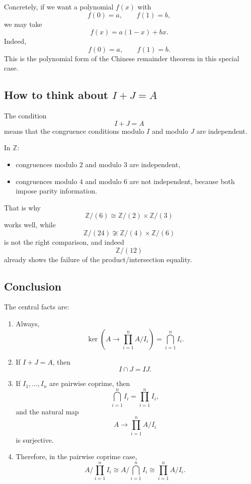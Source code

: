 \documentclass[12pt,a4paper]{article}
\theoremstyle{notespace}
\begin{document}
Concretely, if we want a polynomial \(f(x)\) with
\[
f(0)=a,\qquad f(1)=b,
\]
we may take
\[
f(x)=a(1-x)+bx.
\]
Indeed,
\[
f(0)=a,\qquad f(1)=b.
\]
This is the polynomial form of the Chinese remainder theorem in this special case.

\subsection{How to think about \(I+J=A\)}

The condition
\[
I+J=A
\]
means that the congruence conditions modulo \(I\) and modulo \(J\) are independent.

In \(\mathbb Z\):

\begin{itemize}
	\item congruences modulo \(2\) and modulo \(3\) are independent,
	\item congruences modulo \(4\) and modulo \(6\) are not independent, because both impose parity information.
\end{itemize}

That is why
\[
\mathbb Z/(6)\cong \mathbb Z/(2)\times \mathbb Z/(3)
\]
works well, while
\[
\mathbb Z/(24)\not\cong \mathbb Z/(4)\times \mathbb Z/(6)
\]
is not the right comparison, and indeed
\[
\mathbb Z/(12)
\]
already shows the failure of the product/intersection equality.

\subsection{Conclusion}

The central facts are:

\begin{enumerate}
	\item Always,
	\[
	\ker\!\left(A\to \prod_{i=1}^n A/I_i\right)=\bigcap_{i=1}^n I_i.
	\]
	
	\item If \(I+J=A\), then
	\[
	I\cap J=IJ.
	\]
	
	\item If \(I_1,\dots,I_n\) are pairwise coprime, then
	\[
	\bigcap_{i=1}^n I_i=\prod_{i=1}^n I_i,
	\]
	and the natural map
	\[
	A\to \prod_{i=1}^n A/I_i
	\]
	is surjective.
	
	\item Therefore, in the pairwise coprime case,
	\[
	A\Big/\prod_{i=1}^n I_i
	\cong
	A\Big/\bigcap_{i=1}^n I_i
	\cong
	\prod_{i=1}^n A/I_i.
	\]
\end{enumerate}
\end{document}
